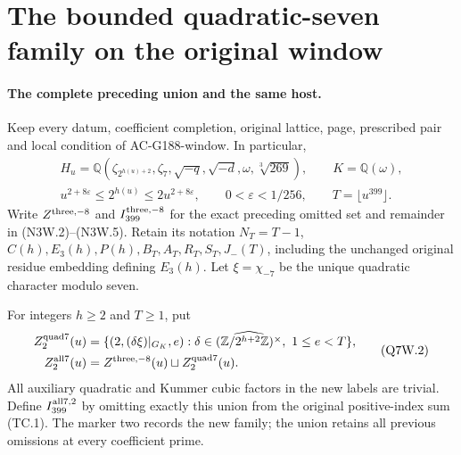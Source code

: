 \section{The bounded quadratic-seven family on the original window}
\label{sec:quadratic-seven-coefficient-two-window}

\paragraph{The complete preceding union and the same host.}
Keep every datum, coefficient completion, original lattice, page,
prescribed pair and local condition of AC-G188-window.
In particular,
\[
 \begin{gathered}
 H_u=\mathbb Q(\zeta_{2^{h(u)+2}},\zeta_7,
           \sqrt{-q},\sqrt{-d},\omega,\sqrt[3]{269}),
             \qquad K=\mathbb Q(\omega),\\
 u^{2+8\varepsilon}\leq2^{h(u)}\leq2u^{2+8\varepsilon},
 \qquad0<\varepsilon<1/256,
 \qquad T=\lfloor u^{399}\rfloor.
 \end{gathered}\tag{Q7W.1}
\]
Write $Z^{\rm three,-8}$ and $I_{399}^{\rm three,-8}$ for the
exact preceding omitted set and remainder in (N3W.2)--(N3W.5).
Retain its notation
$N_T=T-1$, $C(h),E_3(h),P(h),B_T,A_T,R_T,S_T,J_-(T)$,
including the unchanged original residue embedding defining $E_3(h)$.
Let $\xi=\chi_{-7}$ be the unique quadratic character modulo seven.

For integers $h\geq2$ and $T\geq1$, put
\[
 \begin{aligned}
 Z^{\rm quad7}_2(u)
   &=\{(2,(\delta\xi)|_{G_K},e):
       \delta\in\widehat{(\mathbb Z/2^{h+2}\mathbb Z)^\times},
                          \ 1\leq e<T\},\\
 Z^{\rm all7}_2(u)&=Z^{\rm three,-8}(u)\sqcup Z^{\rm quad7}_2(u).
 \end{aligned}\tag{Q7W.2}
\]
All auxiliary quadratic and Kummer cubic factors in the new labels
are trivial.  Define $I_{399}^{\rm all7,2}$ by omitting exactly
this union from the original positive-index sum (TC.1).
The marker two records the new family; the union retains all
previous omissions at every coefficient prime.

